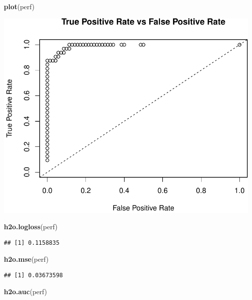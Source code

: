\documentclass[]{article}
\newenvironment{Shaded}{\begin{snugshade}}{\end{snugshade}}
\newcommand{\KeywordTok}[1]{\textcolor[rgb]{0.13,0.29,0.53}{\textbf{{#1}}}}
\newcommand{\NormalTok}[1]{{#1}}
\begin{document}
\begin{Shaded}
\begin{Highlighting}[]
\KeywordTok{plot}\NormalTok{(perf)}
\end{Highlighting}
\end{Shaded}

\begin{center}\includegraphics{webinar_code_files/figure-latex/auc_curve-1} \end{center}

\begin{Shaded}
\begin{Highlighting}[]
\KeywordTok{h2o.logloss}\NormalTok{(perf)}
\end{Highlighting}
\end{Shaded}

\begin{verbatim}
## [1] 0.1158835
\end{verbatim}

\begin{Shaded}
\begin{Highlighting}[]
\KeywordTok{h2o.mse}\NormalTok{(perf)}
\end{Highlighting}
\end{Shaded}

\begin{verbatim}
## [1] 0.03673598
\end{verbatim}

\begin{Shaded}
\begin{Highlighting}[]
\KeywordTok{h2o.auc}\NormalTok{(perf)}
\end{Highlighting}
\end{Shaded}
\end{document}
